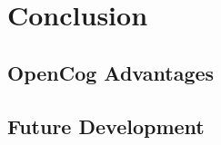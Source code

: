 \chapter{Conclusion} \label{cha:conclusion}


\section{OpenCog Advantages}\label{sec:opencog advantages}


\section{Future Development}\label{sec:future_devel}

